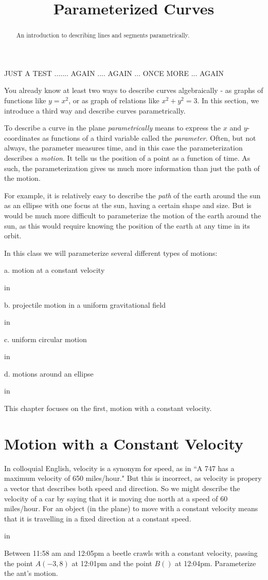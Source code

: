 \documentclass{ximera}
\title{Parameterized Curves}
\newcommand{\pskip}{\vskip 0.1 in}
\begin{document}
\begin{abstract}
An introduction to describing lines and segments parametrically.
\end{abstract}
\maketitle

JUST A TEST ....... AGAIN .... AGAIN ... ONCE MORE ... AGAIN

You already know at least two ways to describe curves algebraically - as graphs of functions like $y=x^2$, or as graph of relations like $x^2 + y^2 = 3$. In this section, we introduce a third way and describe curves parametrically. 

To describe a curve in the plane \emph{parametrically} means to express the $x$ and $y$-coordinates as functions of a third variable called the \emph{parameter}. Often, but not always, the parameter measures time, and in this case the parameterization describes a \emph{motion}. It tells us the position of a point as a function of time. As such, the parameterization gives us much more information than just the path of the motion.

For example, it is relatively easy to describe the \emph{path} of the earth around the sun as an ellipse with one focus at the sun, having a certain shape and size. But is would be much more difficult to parameterize the motion of the earth around the sun, as this would require knowing the position of the earth at any time in its orbit.

In this class we will parameterize several different types of motions:

a. motion at a constant velocity

\pskip

b. projectile motion in a uniform gravitational field

\pskip

c. uniform circular motion

\pskip

d. motions around an ellipse

\pskip

This chapter focuses on the first, motion with a constant velocity.

\section{Motion with a Constant Velocity}

In colloquial English, velocity is a synonym for speed, as in ``A 747 has a maximum velocity of 650 miles/hour." But this is incorrect, as velocity is propery a vector that describes both speed and direction. So we might describe the velocity of a car by saying that it is moving due north at a speed of 60 miles/hour. For an object (in the plane) to move with a constant velocity means that it is travelling in a fixed direction at a constant speed.

\pskip

 Between 11:58 am and 12:05pm a beetle crawls with a constant velocity, passing the point $A(-3,8)$ at 12:01pm and the point $B()$ at 12:04pm. Parameterize the ant's motion.
\end{document}

